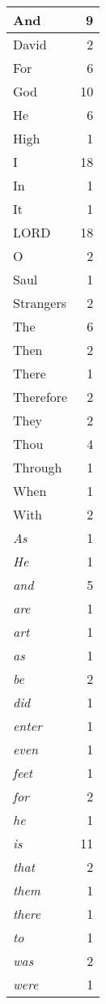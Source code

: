 \begin{center}
\begin{longtable}{l|r}
\hline \hline
\endlastfoot
And & 9 \\ \hline
David & 2 \\ \hline
For & 6 \\ \hline
God & 10 \\ \hline
He & 6 \\ \hline
High & 1 \\ \hline
I & 18 \\ \hline
In & 1 \\ \hline
It & 1 \\ \hline
LORD & 18 \\ \hline
O & 2 \\ \hline
Saul & 1 \\ \hline
Strangers & 2 \\ \hline
The & 6 \\ \hline
Then & 2 \\ \hline
There & 1 \\ \hline
Therefore & 2 \\ \hline
They & 2 \\ \hline
Thou & 4 \\ \hline
Through & 1 \\ \hline
When & 1 \\ \hline
With & 2 \\ \hline
\emph{As} & 1 \\ \hline
\emph{He} & 1 \\ \hline
\emph{and} & 5 \\ \hline
\emph{are} & 1 \\ \hline
\emph{art} & 1 \\ \hline
\emph{as} & 1 \\ \hline
\emph{be} & 2 \\ \hline
\emph{did} & 1 \\ \hline
\emph{enter} & 1 \\ \hline
\emph{even} & 1 \\ \hline
\emph{feet} & 1 \\ \hline
\emph{for} & 2 \\ \hline
\emph{he} & 1 \\ \hline
\emph{is} & 11 \\ \hline
\emph{that} & 2 \\ \hline
\emph{them} & 1 \\ \hline
\emph{there} & 1 \\ \hline
\emph{to} & 1 \\ \hline
\emph{was} & 2 \\ \hline
\emph{were} & 1 \\ \hline

\end{longtable}
\end{center}
